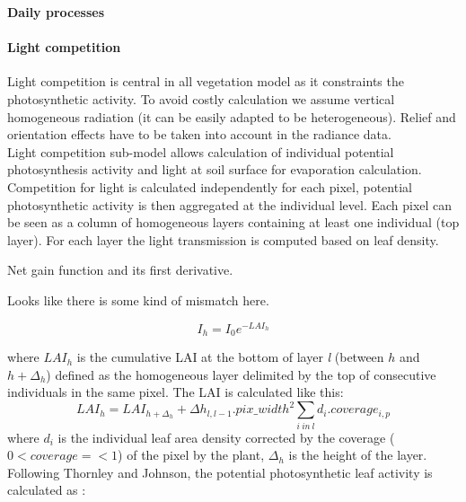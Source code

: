 \documentclass[a4paper,twoside, justified,marginals=raggedright]{tufte-handout}
\begin{document}
\textbf{Daily processes}\\

\paragraph{Light competition}Light competition is central in all vegetation model as it constraints the photosynthetic activity. To avoid costly calculation we assume vertical homogeneous radiation (it can be easily adapted to be heterogeneous). Relief and orientation effects have to be taken into account in the radiance data.\\
Light competition sub-model allows calculation of individual potential photosynthesis activity and light at soil surface for evaporation calculation.\\
Competition for light is calculated independently for each pixel, potential photosynthetic activity is then aggregated at the individual level. Each pixel can be seen as a column of homogeneous layers containing at least one individual (top layer). For each layer the light transmission is computed based on leaf density.


\begin{marginfigure}
\label{fig:derivaives}
\caption{Net gain function and its first derivative.} Looks like there is some kind of mismatch here.
\end{marginfigure}

\begin{equation}\label{eq:Ih}
I_{h} =  I_{0} e^{-LAI_{h}}
\end{equation}

where $LAI_{h}$ is the cumulative LAI at the bottom of layer \textit{l} (between $h$ and $h+\Delta_{h}$) defined as the homogeneous layer delimited by the top of consecutive individuals in the same pixel. The LAI is calculated like this:
\begin{equation}\label{eq:LAI}
LAI_{h} = LAI_{h+\Delta_{h}} +  \Delta h_{l, l-1} . pix\_width^{2} \sum_{i\ in\ l}d_{i}.coverage_{i, p}
\end{equation}
where $d_{i}$ is the individual leaf area density corrected by the coverage ($0< coverage =< 1$) of the pixel by the plant, $\Delta_{h}$ is the height of the layer.\\
Following Thornley and Johnson, the potential photosynthetic leaf activity is calculated as :
\end{document}
